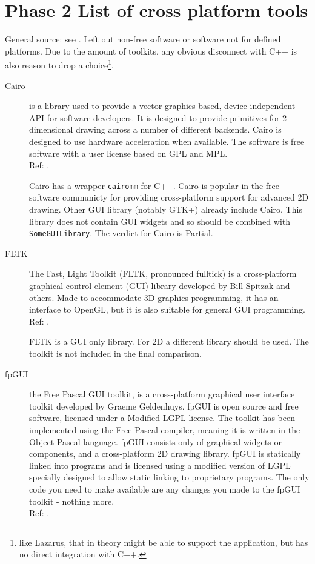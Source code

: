 \section{Phase 2 List of cross platform tools}

General source: see \cite{wiki:xplatf}. Left out non-free software or software
not for defined platforms. Due to the amount of toolkits, any obvious
disconnect with C++ is also reason to drop a choice\footnote{like Lazarus, that
in theory might be able to support the application, but has no direct
integration with C++.}.

\begin{description}
    \item[Cairo] is a library used to provide a vector graphics-based,
		device-independent API for software developers. It is designed
		to provide primitives for 2-dimensional drawing across a number
		of different backends. Cairo is designed to use hardware
		acceleration when available.
		The software is free software with a user license based on GPL
		and MPL.
		\hspace*{\fill}\\Ref: \cite{wiki:cairo}.

		Cairo has a wrapper \verb!cairomm! for C++.  Cairo is popular in the
		free software communicty for providing cross-platform support for
		advanced 2D drawing. Other GUI library (notably GTK+) already include
		Cairo. This library does not contain GUI widgets and so should be
		combined with \verb!SomeGUILibrary!. The verdict for Cairo is Partial.

    \item[FLTK] The Fast, Light Toolkit (FLTK, pronounced fulltick) is a
		cross-platform graphical control element (GUI)
		library developed by Bill Spitzak and others. Made to
		accommodate 3D graphics programming, it has an interface to
		OpenGL, but it is also suitable for general GUI programming.
		\hspace*{\fill}\\Ref: \cite{wiki:fltk}.

		FLTK is a GUI only library. For 2D a different library should be used.
		The toolkit is not included in the final comparison.

    \item[fpGUI] the Free Pascal GUI toolkit, is a cross-platform
		graphical user interface toolkit developed by Graeme Geldenhuys.
		fpGUI is open source and free software, licensed under a Modified LGPL
		license. The toolkit has been implemented using the Free Pascal
		compiler, meaning it is written in the Object Pascal language.
		fpGUI consists only of graphical widgets or components, and a
		cross-platform 2D drawing library.
		fpGUI is statically linked into programs and is licensed using a
		modified version of LGPL specially designed to allow static linking to
		proprietary programs. The only code you need to make available are
		any changes you made to the fpGUI toolkit - nothing more.
		\hspace*{\fill}\\Ref: \cite{wiki:fpgui}.


\end{description}

